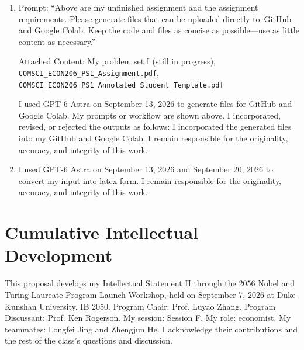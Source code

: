 \begin{enumerate}
\item Prompt: “Above are my unfinished assignment and the assignment requirements. Please generate files that can be uploaded directly to~GitHub and Google Colab. Keep the code and files as concise as possible—use as little content as necessary.”

Attached Content: My problem set I (still in progress), {\def\UrlBreaks{\do a\do b\do c\do d\do e\do f\do g\do h\do i\do j\do k\do l\do m\do n\do o\do p\do q\do r\do s\do t\do u\do v\do w\do x\do y\do z\do A\do B\do C\do D\do E\do F\do G\do H\do I\do J\do K\do L\do M\do N\do O\do P\do Q\do R\do S\do T\do U\do V\do W\do X\do Y\do Z\do 0\do 1\do 2\do 3\do 4\do 5\do 6\do 7\do 8\do 9\do /\do -\do _\do .\do ?\do =\do &}\nolinkurl{COMSCI_ECON206_PS1_Assignment.pdf}}, {\def\UrlBreaks{\do a\do b\do c\do d\do e\do f\do g\do h\do i\do j\do k\do l\do m\do n\do o\do p\do q\do r\do s\do t\do u\do v\do w\do x\do y\do z\do A\do B\do C\do D\do E\do F\do G\do H\do I\do J\do K\do L\do M\do N\do O\do P\do Q\do R\do S\do T\do U\do V\do W\do X\do Y\do Z\do 0\do 1\do 2\do 3\do 4\do 5\do 6\do 7\do 8\do 9\do /\do -\do _\do .\do ?\do =\do &}\nolinkurl{COMSCI_ECON206_PS1_Annotated_Student_Template.pdf}}

I used GPT-6 Astra on September 13, 2026 to generate files for GitHub and Google Colab. My prompts or workflow are shown above. I incorporated, revised, or rejected the outputs as follows: I incorporated the generated files into my GitHub and Google Colab. I remain responsible for the originality, accuracy, and integrity of this work.


\item I used GPT-6 Astra on September 13, 2026 and September 20, 2026 to convert my input into latex form. I remain responsible for the originality, accuracy, and integrity of this work.


\end{enumerate}
\section{Cumulative Intellectual Development}
This proposal develops my Intellectual Statement II through the 2056 Nobel and Turing Laureate Program Launch Workshop, held on September 7, 2026 at Duke Kunshan University, IB 2050. Program Chair: Prof. Luyao Zhang. Program Discussant: Prof. Ken Rogerson. My session: Session F. My role: economist. My teammates: Longfei Jing and Zhengjun He. I acknowledge their contributions and the rest of the class’s questions and discussion.

